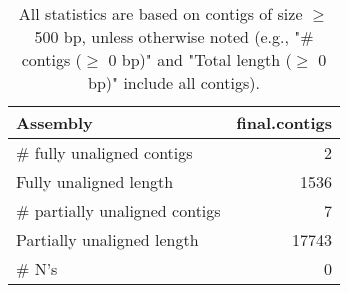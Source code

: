 \documentclass[12pt,a4paper]{article}
\begin{document}
\begin{table}[ht]
\begin{center}
\caption{All statistics are based on contigs of size $\geq$ 500 bp, unless otherwise noted (e.g., "\# contigs ($\geq$ 0 bp)" and "Total length ($\geq$ 0 bp)" include all contigs).}
\begin{tabular}{|l*{1}{|r}|}
\hline
Assembly & final.contigs \\ \hline
\# fully unaligned contigs & 2 \\ \hline
Fully unaligned length & 1536 \\ \hline
\# partially unaligned contigs & 7 \\ \hline
Partially unaligned length & 17743 \\ \hline
\# N's & 0 \\ \hline
\end{tabular}
\end{center}
\end{table}
\end{document}
